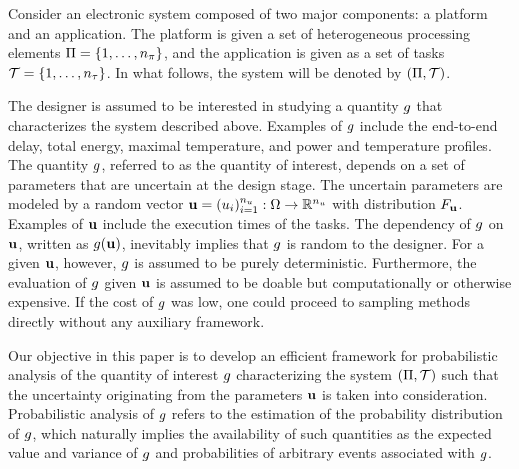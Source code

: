 Consider an electronic system composed of two major components: a platform and
an application. The platform is given a set of heterogeneous processing elements
$\Pi = \{ 1, \dots, {n_\pi} \}$, and the application is given as a set of tasks
$\mathcal{T} = \{ 1, \dots, {n_\tau} \}$. In what follows, the system will be denoted by
$(\Pi, \mathcal{T})$.

The designer is assumed to be interested in studying a quantity $g$ that
characterizes the system described above. Examples of $g$ include the
end-to-end delay, total energy, maximal temperature, and power and temperature
profiles. The quantity $g$, referred to as the quantity of interest, depends on
a set of parameters that are uncertain at the design stage. The uncertain
parameters are modeled by a random vector $\mathbf{u} = (u_i)_{i = 1}^{n_u}: \Omega
\to \mathbb{R}^{n_u}$ with distribution $F_{\mathbf{u}}$. Examples of $\mathbf{u}$ include
the execution times of the tasks. The dependency of $g$ on $\mathbf{u}$, written as
$g(\mathbf{u})$, inevitably implies that $g$ is random to the designer. For a given
$\mathbf{u}$, however, $g$ is assumed to be purely deterministic. Furthermore, the
evaluation of $g$ given $\mathbf{u}$ is assumed to be doable but computationally or
otherwise expensive. If the cost of $g$ was low, one could proceed to sampling
methods directly without any auxiliary framework.

Our objective in this paper is to develop an efficient framework for
probabilistic analysis of the quantity of interest $g$ characterizing the
system $(\Pi, \mathcal{T})$ such that the uncertainty originating from the
parameters $\mathbf{u}$ is taken into consideration. Probabilistic analysis of $g$
refers to the estimation of the probability distribution of $g$, which
naturally implies the availability of such quantities as the expected value and
variance of $g$ and probabilities of arbitrary events associated with $g$.
